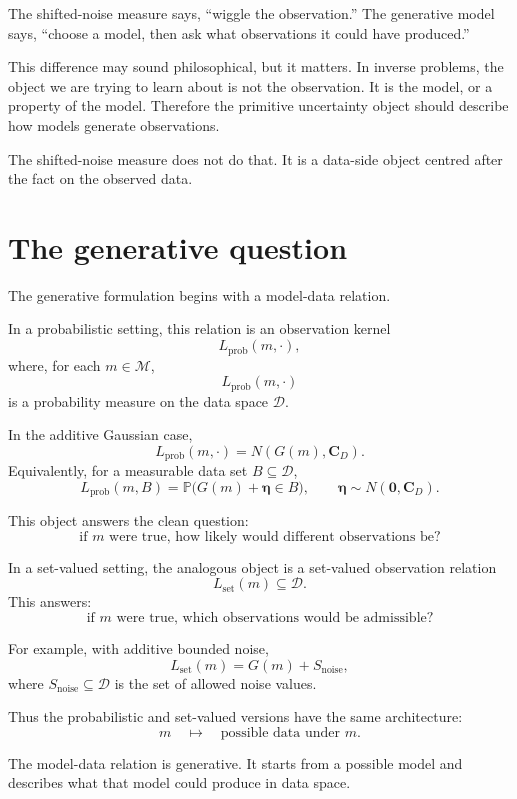 \documentclass[11pt,openany]{book}
\theoremstyle{definition}
\theoremstyle{remark}
\newcommand{\M}{\mathcal M}
\newcommand{\D}{\mathcal D}
\begin{document}
\begin{intuitionbox}
The shifted-noise measure says, ``wiggle the observation.'' The generative model says,
``choose a model, then ask what observations it could have produced.''
\end{intuitionbox}

This difference may sound philosophical, but it matters. In inverse problems, the object we are
trying to learn about is not the observation. It is the model, or a property of the model. Therefore
the primitive uncertainty object should describe how models generate observations.

The shifted-noise measure does not do that. It is a data-side object centred after the fact on the
observed data.

\section{The generative question}

The generative formulation begins with a model-data relation.

In a probabilistic setting, this relation is an observation kernel
\[
  L_{\mathrm{prob}}(m,\cdot),
\]
where, for each \(m\in\M\),
\[
  L_{\mathrm{prob}}(m,\cdot)
\]
is a probability measure on the data space \(\D\).

In the additive Gaussian case,
\[
  L_{\mathrm{prob}}(m,\cdot)
  =
  N(G(m),\mathbf C_D).
\]
Equivalently, for a measurable data set \(B\subseteq\D\),
\[
  L_{\mathrm{prob}}(m,B)
  =
  \mathbb P\bigl(G(m)+\boldsymbol\eta\in B\bigr),
  \qquad
  \boldsymbol\eta\sim N(\mathbf 0,\mathbf C_D).
\]

This object answers the clean question:
\[
  \text{if }m\text{ were true, how likely would different observations be?}
\]

In a set-valued setting, the analogous object is a set-valued observation relation
\[
  L_{\mathrm{set}}(m)\subseteq\D.
\]
This answers:
\[
  \text{if }m\text{ were true, which observations would be admissible?}
\]

For example, with additive bounded noise,
\[
  L_{\mathrm{set}}(m)
  =
  G(m)+S_{\mathrm{noise}},
\]
where \(S_{\mathrm{noise}}\subseteq\D\) is the set of allowed noise values.

Thus the probabilistic and set-valued versions have the same architecture:
\[
  m
  \quad\longmapsto\quad
  \text{possible data under }m.
\]

\begin{lessonbox}
The model-data relation is generative. It starts from a possible model and describes what that
model could produce in data space.
\end{lessonbox}
\end{document}
